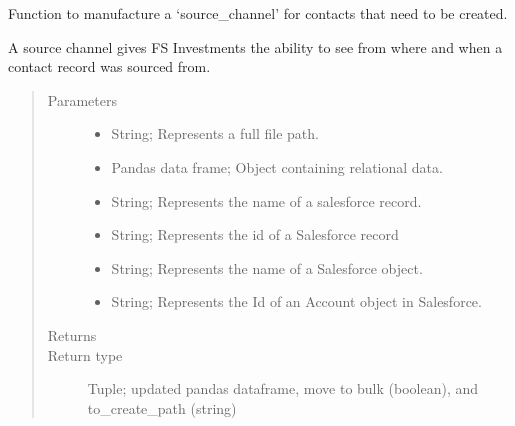 \documentclass[letterpaper,10pt,english]{sphinxmanual}
\begin{document}
\begin{fulllineitems}
\label{\detokenize{index:ListManagement.sources.bdgs.make_sc}}
Function to manufacture a ‘source\_channel’ for contacts
that need to be created.

A source channel gives FS Investments the ability to see
from where and when a contact record was sourced from.
\begin{quote}\begin{description}
\item[{Parameters}] \leavevmode\begin{itemize}
\item {} 
 \textendash{} String; Represents a full file path.

\item {} 
 \textendash{} Pandas data frame; Object containing relational data.

\item {} 
 \textendash{} String; Represents the name of a salesforce record.

\item {} 
 \textendash{} String; Represents the id of a Salesforce record

\item {} 
 \textendash{} String; Represents the name of a Salesforce object.

\item {} 
 \textendash{} String; Represents the Id of an Account object in Salesforce.

\end{itemize}

\item[{Returns}] \leavevmode


\item[{Return type}] \leavevmode
Tuple; updated pandas dataframe, move to bulk (boolean), and to\_create\_path (string)

\end{description}\end{quote}

\end{fulllineitems}
\end{document}
